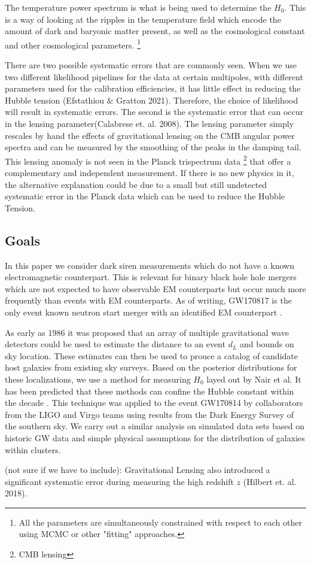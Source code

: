 The temperature power spectrum is what is being used to determine the $H_0$. This is a way of looking at the ripples in the temperature field which encode the amount of dark and baryonic matter present, as well as the cosmological constant and other cosmological parameters.
\footnote{All the parameters are simultaneously constrained with respect to each other using MCMC or other "fitting" approaches. }

There are two possible systematic errors that are commonly seen. When we use two different likelihood pipelines for the data at certain multipoles, with different parameters used for the calibration efficiencies, it has little effect in reducing the Hubble tension (Efstathiou $\&$ Gratton 2021). Therefore, the choice of likelihood will result in systematic errors. 
The second is the systematic error that can occur in the lensing parameter(Calabrese et. al. 2008). The lensing parameter simply rescales by hand the effects of gravitational lensing on the CMB angular power spectra and can be measured by the smoothing of the peaks in the damping tail. This lensing anomaly is not seen in the
Planck trispectrum data \footnote{CMB lensing} that offer a complementary and independent measurement. If there is no new physics in it, the alternative explanation could be due to a small but still undetected systematic error in the Planck data which can be used to reduce the Hubble Tension.

\subsection{\label{Goals} Goals}
In this paper we consider dark siren measurements which do not have a known electromagnetic counterpart. This is relevant for binary black hole hole mergers which are not expected to have observable EM counterparts but occur much more frequently than events with EM counterparts. As of writing, GW170817 is the only event known neutron start merger with an identified EM counterpart \cite{GW170817_announce}.

As early as 1986 it was proposed that an array of multiple gravitational wave detectors could be used to estimate the distance to an event $d_L$ and bounds on sky location\cite{Schutz_1986}. These estimates can then be used to prouce a catalog of candidate host galaxies from existing sky surveys. Based on the posterior distributions for these localizations, we use a method for measuring $H_0$ layed out by Nair et al\cite{Nair_2018}. It has been predicted that these methods can confine the Hubble constant within the decade \cite{Chen_2018}. This technique was applied to the event GW170814 by collaborators from the LIGO and Virgo teams using results from the Dark Energy Survey of the southern sky\cite{GW170814_DES}. We carry out a similar analysis on simulated data sets based on historic GW data and simple physical assumptions for the distribution of galaxies within clusters.



(not sure if we have to include):
Gravitational Lensing also introduced a significant systematic error during measuring the high redshift $z$ (Hilbert et. al. 2018). 
